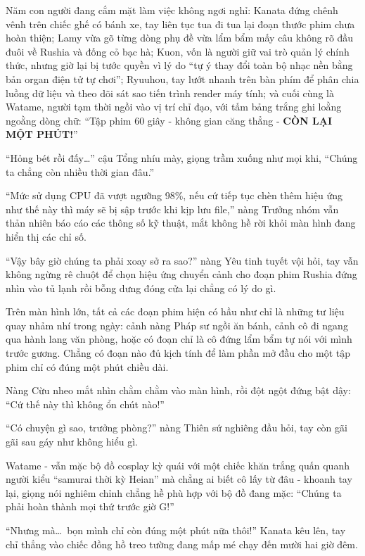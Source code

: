 \documentclass[../main.tex]{subfiles}
\begin{document}
Năm con người đang cắm mặt làm việc không ngơi nghỉ: Kanata đứng chênh vênh trên chiếc ghế có bánh xe, tay liên tục tua đi tua lại đoạn thước phim chưa hoàn thiện; Lamy vừa gõ từng dòng phụ đề vừa lẩm bẩm mấy câu không rõ đầu đuôi về Rushia và đống cỏ bạc hà; Kuon, vốn là người giữ vai trò quản lý chính thức, nhưng giờ lại bị tước quyền vì lý do ``tự ý thay đổi toàn bộ nhạc nền bằng bản organ điện tử tự chơi''; Ryuuhou, tay lướt nhanh trên bàn phím để phân chia luồng dữ liệu và theo dõi sát sao tiến trình render máy tính; và cuối cùng là Watame, người tạm thời ngồi vào vị trí chỉ đạo, với tấm bảng trắng ghi loằng ngoằng dòng chữ: ``Tập phim 60 giây - không gian căng thẳng - \textbf{CÒN LẠI MỘT PHÚT!}''

``Hỏng bét rồi đấy\dots'' cậu Tổng nhíu mày, giọng trầm xuống như mọi khi, ``Chúng ta chẳng còn nhiều thời gian đâu.''

``Mức sử dụng CPU đã vượt ngưỡng 98\%, nếu cứ tiếp tục chèn thêm hiệu ứng như thế này thì máy sẽ bị sập trước khi kịp lưu file,'' nàng Trưởng nhóm vẫn thản nhiên báo cáo các thông số kỹ thuật, mắt không hề rời khỏi màn hình đang hiển thị các chỉ số.

``Vậy bây giờ chúng ta phải xoay sở ra sao?'' nàng Yêu tinh tuyết vội hỏi, tay vẫn không ngừng rê chuột để chọn hiệu ứng chuyển cảnh cho đoạn phim Rushia đứng nhìn vào tủ lạnh rồi bỗng dưng đóng cửa lại chẳng có lý do gì.

Trên màn hình lớn, tất cả các đoạn phim hiện có hầu như chỉ là những tư liệu quay nhảm nhí trong ngày: cảnh nàng Pháp sư ngồi ăn bánh, cảnh cô đi ngang qua hành lang văn phòng, hoặc có đoạn chỉ là cô đứng lẩm bẩm tự nói với mình trước gương. Chẳng có đoạn nào đủ kịch tính để làm phần mở đầu cho một tập phim chỉ có đúng một phút chiều dài.

Nàng Cừu nheo mắt nhìn chằm chằm vào màn hình, rồi đột ngột đứng bật dậy: ``Cứ thế này thì không ổn chút nào!''

``Có chuyện gì sao, trưởng phòng?'' nàng Thiên sứ nghiêng đầu hỏi, tay còn gãi gãi sau gáy như không hiểu gì.

Watame - vẫn mặc bộ đồ cosplay kỳ quái với một chiếc khăn trắng quấn quanh người kiểu ``samurai thời kỳ Heian'' mà chẳng ai biết cô lấy từ đâu - khoanh tay lại, giọng nói nghiêm chỉnh chẳng hề phù hợp với bộ đồ đang mặc: ``Chúng ta phải hoàn thành mọi thứ trước giờ G!''

``Nhưng mà\dots\ bọn mình chỉ còn đúng một phút nữa thôi!'' Kanata kêu lên, tay chỉ thẳng vào chiếc đồng hồ treo tường đang mấp mé chạy đến mười hai giờ đêm.
\end{document}
